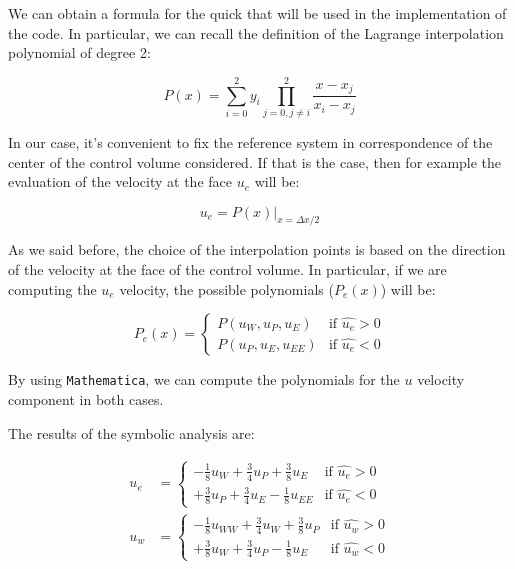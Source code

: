 We can obtain a formula for the \acrshort{quick} that will be used in the implementation of the code.
In particular, we can recall the definition of the Lagrange interpolation polynomial of degree 2:

\begin{equation}
    P(x) = \sum_{i=0}^{2} y_i \prod_{j=0, j \neq i}^{2} \frac{x - x_j}{x_i - x_j}
    \label{eq:langrange_interpolation_polynomial}
\end{equation}

In our case, it's convenient to fix the reference system in correspondence of the center of the control volume considered.
If that is the case, then for example the evaluation of the velocity at the face $u_e$ will be:

\begin{equation}
    u_e = P(x) \bigg|_{x = \Delta x/2}
\end{equation}

As we said before, the choice of the interpolation points is based on the direction of the velocity at the face of the control volume.
In particular, if we are computing the $u_e$ velocity, the possible polynomials ($P_e(x)$) will be:

\begin{equation}
    P_e(x) = \begin{cases}
        P(u_W, u_P, u_E)    & \text{if } \hat{u_e} > 0 \\
        P(u_P, u_E, u_{EE}) & \text{if } \hat{u_e} < 0
    \end{cases}
\end{equation}

By using \texttt{Mathematica}, we can compute the polynomials for the $u$ velocity component in both cases.

The results of the symbolic analysis are:

\begin{align}
    u_e & = \begin{cases}
                -\frac{1}{8} u_W + \frac{3}{4} u_P + \frac{3}{8} u_E    & \text{if } \hat{u_e} > 0 \\
                +\frac{3}{8} u_P + \frac{3}{4} u_E - \frac{1}{8} u_{EE} & \text{if } \hat{u_e} < 0
            \end{cases}    \\
    u_w & = \begin{cases}
                -\frac{1}{8} u_{WW} +    \frac{3}{4} u_W + \frac{3}{8} u_P & \text{if } \hat{u_w} > 0 \\
                +\frac{3}{8} u_W + \frac{3}{4} u_P - \frac{1}{8} u_E       & \text{if } \hat{u_w} < 0
            \end{cases}
\end{align}

